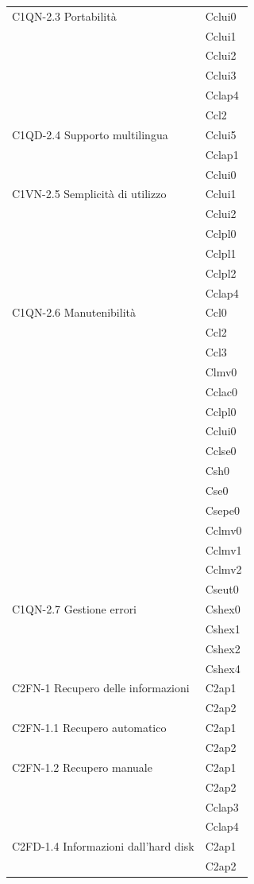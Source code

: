 \begin{footnotesize}
\begin{longtable}[!h]{|l|l|}
C1QN-2.3 Portabilit\`a & Cclui0\\
& Cclui1\\
& Cclui2\\
& Cclui3\\
& Cclap4\\
& Ccl2\\\hline   
C1QD-2.4 Supporto multilingua & Cclui5\\    
& Cclap1\\
& Cclui0\\\hline                
C1VN-2.5 Semplicit\`a di utilizzo & Cclui1\\
& Cclui2\\
& Cclpl0\\
& Cclpl1\\
& Cclpl2\\
& Cclap4\\\hline
C1QN-2.6 Manutenibilit\`a & Ccl0\\
& Ccl2\\
& Ccl3\\
& Clmv0\\
& Cclac0\\
& Cclpl0\\
& Cclui0\\
& Cclse0\\
& Csh0\\
& Cse0\\
& Csepe0\\
& Cclmv0\\
& Cclmv1\\
& Cclmv2\\
& Cseut0\\\hline                    
C1QN-2.7 Gestione errori  & Cshex0\\
& Cshex1\\
& Cshex2\\
& Cshex4\\\hline     
C2FN-1 Recupero delle informazioni & C2ap1 \\
& C2ap2\\\hline  
C2FN-1.1 Recupero automatico &  C2ap1 \\
& C2ap2\\\hline
C2FN-1.2 Recupero manuale &  C2ap1\\
&  C2ap2 \\
&  Cclap3\\
&  Cclap4\\\hline  
C2FD-1.4 Informazioni dall'hard disk & C2ap1 \\
&  C2ap2\\\hline  

\end{longtable}
\end{footnotesize}
